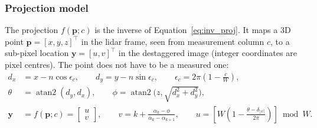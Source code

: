 \subsubsection{Projection model}
The projection $f(\mathbf{p}; c)$ is the inverse of Equation~\eqref{eq:inv_proj}. It maps a 3D point $\mathbf{p} = [x, y, z]^{\top}$ in the lidar frame, seen from measurement column $c$, to a sub-pixel location $\mathbf{y} = [u, v]^{\top}$ in the destaggered image (integer coordinates are pixel centres). The point does not have to be a measured one:
\begin{equation}
    \label{eq:proj}
    \begin{split}
        d_x &= x - n\cos\epsilon_c, \qquad d_y = y - n\sin\epsilon_c, \qquad \epsilon_c = 2\pi\left(1 - \frac{c}{W}\right), \\
        \theta &= \operatorname{atan2}(d_y, d_x), \qquad \phi = \operatorname{atan2}\Big(z, \sqrt{d_x^2 + d_y^2}\Big), \\
        \mathbf{y} &= f(\mathbf{p}; c) = \begin{bmatrix} u \\ v \end{bmatrix}, \qquad
        v = k + \frac{\alpha_k - \phi}{\alpha_k - \alpha_{k+1}}, \qquad
        u = \left[W\left(1 - \frac{\theta - \delta_{\lfloor v \rceil}}{2\pi}\right)\right] \bmod W.
    \end{split}
\end{equation}
